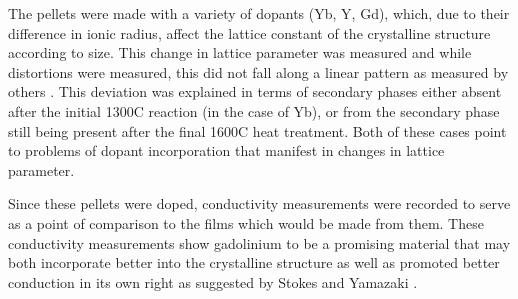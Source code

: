 The pellets were made with a variety of dopants (Yb, Y, Gd), which, due to their difference in ionic radius, affect the lattice constant of the crystalline structure according to size. This change in lattice parameter was measured and while distortions were measured, this did not fall along a linear pattern as measured by others \cite{Gilardi2017}. This deviation was explained in terms of secondary phases either absent after the initial 1300\textdegree C reaction (in the case of Yb), or from the secondary phase still being present after the final 1600\textdegree C heat treatment. Both of these cases point to problems of dopant incorporation that manifest in changes in lattice parameter. 

Since these pellets were doped, conductivity measurements were recorded to serve as a point of comparison to the films which would be made from them. These conductivity measurements show gadolinium to be a promising material that may both incorporate better into the crystalline structure as well as promoted better conduction in its own right as suggested by Stokes \cite{Stokes2010} and Yamazaki \cite{Yamazaki2013}. 